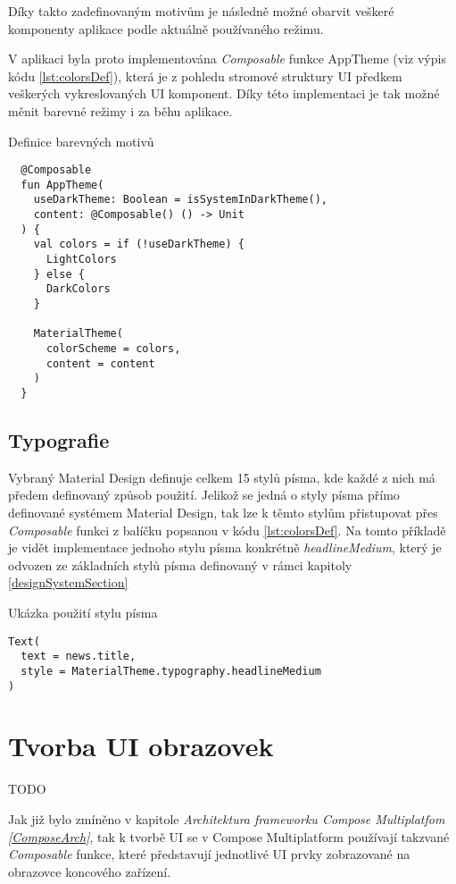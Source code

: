Díky takto zadefinovaným motivům je následně možné obarvit veškeré komponenty aplikace podle aktuálně používaného režimu.

V aplikaci byla proto implementována \textit{Composable} funkce AppTheme (viz výpis kódu \ref{lst:colorsDef}), která je z pohledu stromové struktury
UI předkem veškerých vykreslovaných UI komponent. Díky této implementaci je tak možné měnit barevné režimy i za běhu aplikace. 
\begin{listing}[H]
\caption{Definice barevných motivů}\label{lst:colorsDef}
\begin{verbatim}
  @Composable
  fun AppTheme(
    useDarkTheme: Boolean = isSystemInDarkTheme(),
    content: @Composable() () -> Unit
  ) {
    val colors = if (!useDarkTheme) {
      LightColors
    } else {
      DarkColors
    }
  
    MaterialTheme(
      colorScheme = colors,
      content = content
    )
  }
\end{verbatim}
\end{listing}


\subsection*{Typografie}
Vybraný Material Design definuje celkem 15 stylů písma, kde každé z nich má předem definovaný způsob použití. \cite{material3} 
Jelikož se jedná o styly písma přímo definované systémem Material Design, tak lze k těmto stylům přistupovat přes
\textit{Composable} funkci  z balíčku  popsanou v kódu \ref{lst:colorsDef}.
Na tomto příkladě je vidět implementace jednoho stylu písma konkrétně \textit{headlineMedium}, který je odvozen ze základních stylů písma 
definovaný v rámci kapitoly \ref{designSystemSection}
\begin{listing}[H]
\caption{Ukázka použití stylu písma}\label{lst:typographyExample}
\begin{verbatim}
Text(
  text = news.title,
  style = MaterialTheme.typography.headlineMedium
)
\end{verbatim}
\end{listing}

\section{Tvorba UI obrazovek}
TODO %

Jak již bylo zmíněno v kapitole \textit{Architektura frameworku Compose Multiplatfom \ref{ComposeArch}}, tak k tvorbě UI se v Compose Multiplatform 
používají takzvané \textit{Composable} funkce, které představují jednotlivé UI prvky zobrazované na obrazovce koncového zařízení. 

